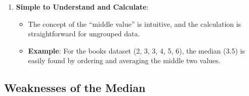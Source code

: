 \documentclass[11pt]{article}
\begin{document}
\begin{enumerate}
    \item \textbf{Simple to Understand and Calculate}:
    \begin{itemize}
        \item The concept of the “middle value” is intuitive, and the calculation is straightforward for ungrouped data.
        \item \textbf{Example}: For the books dataset (2, 3, 3, 4, 5, 6), the median (3.5) is easily found by ordering and averaging the middle two values.
    \end{itemize}
\end{enumerate}

\subsection*{Weaknesses of the Median}
\end{document}
